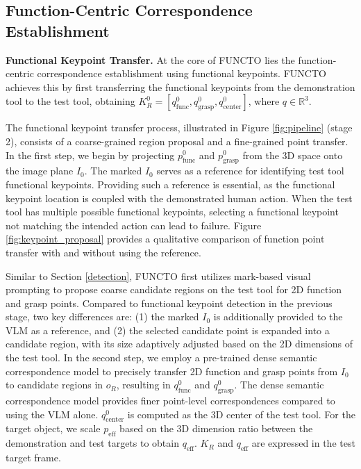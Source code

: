 \subsection{Function-Centric Correspondence Establishment}\label{correspondence}
\noindent \textbf{Functional Keypoint Transfer.} At the core of FUNCTO lies the function-centric correspondence establishment using functional keypoints. FUNCTO achieves this by first transferring the functional keypoints from the demonstration tool to the test tool, obtaining $K_R^0 = [q_{\text{func}}^0, q_{\text{grasp}}^0, q_{\text{center}}^0]$, where $q \in \mathbb{R}^3$. 

The functional keypoint transfer process, illustrated in Figure \ref{fig:pipeline} (stage 2),  consists of a coarse-grained region proposal and a fine-grained point transfer. In the first step, we begin by projecting $p_{\text{func}}^0$ and $p_{\text{grasp}}^0$ from the 3D space onto the image plane $I_0$. The marked $I_0$ serves as a reference for identifying test tool functional keypoints. Providing such a reference is essential, as the functional keypoint location is coupled with the demonstrated human action. When the test tool has multiple possible functional keypoints, selecting a functional keypoint not matching the intended action can lead to failure. Figure \ref{fig:keypoint_proposal} provides a qualitative comparison of function point transfer with and without using the reference.

Similar to Section \ref{detection}, FUNCTO first utilizes mark-based visual prompting to propose coarse candidate regions on the test tool for 2D function and grasp points. Compared to functional keypoint detection in the previous stage, two key differences are: (1) the marked  $I_0$  is additionally provided to the VLM as a reference, and (2) the selected candidate point is expanded into a candidate region, with its size adaptively adjusted based on the 2D dimensions of the test tool. In the second step, we employ a pre-trained dense semantic correspondence model \cite{zhang2024tale} to precisely transfer 2D function and grasp points from $I_0$ to candidate regions in $o_R$, resulting in  $q_{\text{func}}^0$  and $q_{\text{grasp}}^0$. The dense semantic correspondence model provides finer point-level correspondences compared to using the VLM alone. $q_{\text{center}}^0$ is computed as the 3D center of the test tool. For the target object, we scale $p_{\text{eff}}$  based on the 3D dimension ratio between the demonstration and test targets to obtain  $q_{\text{eff}}$. $K_R$ and  $q_{\text{eff}}$  are expressed in the test target frame. \\

